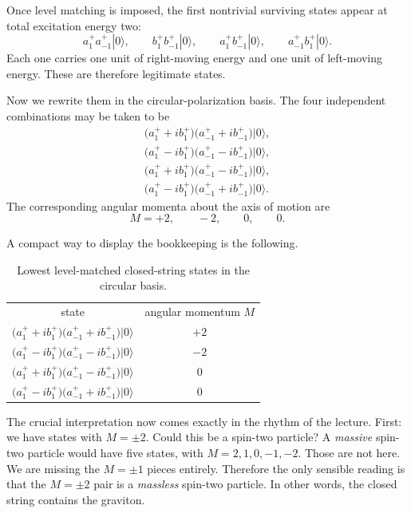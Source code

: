 Once level matching is imposed, the first nontrivial surviving states appear at total excitation energy two:
\begin{equation}
a_1^+a_{-1}^+|0\rangle,\qquad
b_1^+b_{-1}^+|0\rangle,\qquad
a_1^+b_{-1}^+|0\rangle,\qquad
a_{-1}^+b_1^+|0\rangle.
\end{equation}
Each one carries one unit of right-moving energy and one unit of left-moving energy. These are therefore legitimate states.

Now we rewrite them in the circular-polarization basis. The four independent combinations may be taken to be
\begin{align}
\big(a_1^+ + i b_1^+\big)\big(a_{-1}^+ + i b_{-1}^+\big)|0\rangle,\label{eq:spin2plus}\\
\big(a_1^+ - i b_1^+\big)\big(a_{-1}^+ - i b_{-1}^+\big)|0\rangle,\label{eq:spin2minus}\\
\big(a_1^+ + i b_1^+\big)\big(a_{-1}^+ - i b_{-1}^+\big)|0\rangle,\label{eq:scalarone}\\
\big(a_1^+ - i b_1^+\big)\big(a_{-1}^+ + i b_{-1}^+\big)|0\rangle.\label{eq:scalartwo}
\end{align}
The corresponding angular momenta about the axis of motion are
\begin{equation}
M=+2,\qquad -2,\qquad 0,\qquad 0.
\end{equation}

A compact way to display the bookkeeping is the following.

\begin{table}[t]
\centering
\begin{tabular}{c c}
state & angular momentum \(M\) \\
\(\big(a_1^+ + i b_1^+\big)\big(a_{-1}^+ + i b_{-1}^+\big)|0\rangle\) & \(+2\) \\
\(\big(a_1^+ - i b_1^+\big)\big(a_{-1}^+ - i b_{-1}^+\big)|0\rangle\) & \(-2\) \\
\(\big(a_1^+ + i b_1^+\big)\big(a_{-1}^+ - i b_{-1}^+\big)|0\rangle\) & \(0\) \\
\(\big(a_1^+ - i b_1^+\big)\big(a_{-1}^+ + i b_{-1}^+\big)|0\rangle\) & \(0\)
\end{tabular}
\caption{Lowest level-matched closed-string states in the circular basis.}
\end{table}

The crucial interpretation now comes exactly in the rhythm of the lecture. First: we have states with \(M=\pm2\). Could this be a spin-two particle? A \emph{massive} spin-two particle would have five states, with \(M=2,1,0,-1,-2\). Those are not here. We are missing the \(M=\pm1\) pieces entirely. Therefore the only sensible reading is that the \(M=\pm2\) pair is a \emph{massless} spin-two particle. In other words, the closed string contains the graviton.

